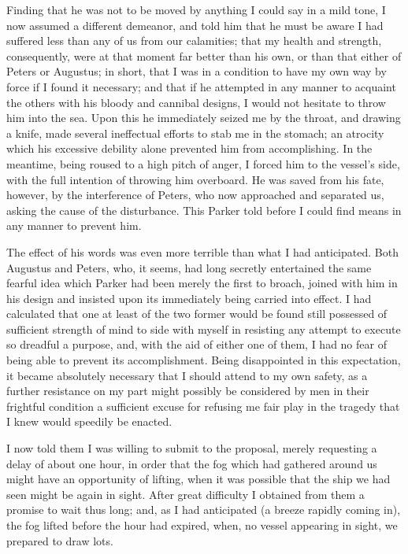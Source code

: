 Finding that he was not to be moved by anything I could say in a mild tone, I
now assumed a different demeanor, and told him that he must be aware I had
suffered less than any of us from our calamities; that my health and strength,
consequently, were at that moment far better than his own, or than that either
of Peters or Augustus; in short, that I was in a condition to have my own way by
force if I found it necessary; and that if he attempted in any manner to
acquaint the others with his bloody and cannibal designs, I would not hesitate
to throw him into the sea. Upon this he immediately seized me by the throat, and
drawing a knife, made several ineffectual efforts to stab me in the stomach; an
atrocity which his excessive debility alone prevented him from accomplishing. In
the meantime, being roused to a high pitch of anger, I forced him to the
vessel's side, with the full intention of throwing him overboard. He was saved
from his fate, however, by the interference of Peters, who now approached and
separated us, asking the cause of the disturbance. This Parker told before I
could find means in any manner to prevent him. 

The effect of his words was even more terrible than what I had anticipated.
Both Augustus and Peters, who, it seems, had long secretly entertained the same
fearful idea which Parker had been merely the first to broach, joined with him
in his design and insisted upon its immediately being carried into effect. I had
calculated that one at least of the two former would be found still possessed of
sufficient strength of mind to side with myself in resisting any attempt to
execute so dreadful a purpose, and, with the aid of either one of them, I had no
fear of being able to prevent its accomplishment. Being disappointed in this
expectation, it became absolutely necessary that I should attend to my own
safety, as a further resistance on my part might possibly be considered by men
in their frightful condition a sufficient excuse for refusing me fair play in
the tragedy that I knew would speedily be enacted. 

I now told them I was willing to submit to the proposal, merely requesting a
delay of about one hour, in order that the fog which had gathered around us
might have an opportunity of lifting, when it was possible that the ship we had
seen might be again in sight. After great difficulty I obtained from them a
promise to wait thus long; and, as I had anticipated (a breeze rapidly coming
in), the fog lifted before the hour had expired, when, no vessel appearing in
sight, we prepared to draw lots. 

